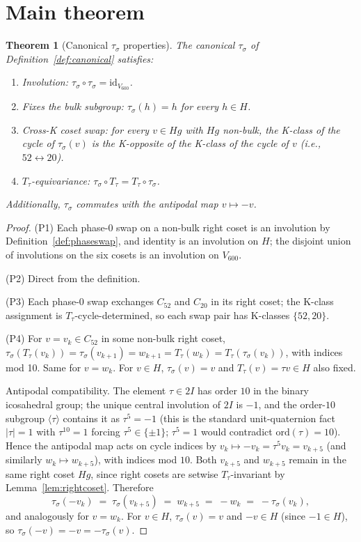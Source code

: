 \documentclass[11pt]{article}
\newtheorem{theorem}{Theorem}[section]
\newcommand{\twoI}{2I}
\newcommand{\Vsixhundred}{V_{600}}
\newcommand{\sigmaG}{\sigma}
\newcommand{\tausigma}{\tau_{\!\sigmaG}}
\newcommand{\Ttau}{T_{\tau}}
\begin{document}
\section{Main theorem}\label{sec:main}

\begin{theorem}[Canonical $\tausigma$ properties]\label{thm:main}
The canonical $\tausigma$ of Definition~\ref{def:canonical} satisfies:
\begin{enumerate}[label=(P\arabic*),leftmargin=3em]
\item \emph{Involution:} $\tausigma \circ \tausigma = \mathrm{id}_{\Vsixhundred}$.
\item \emph{Fixes the bulk subgroup:} $\tausigma(h) = h$ for every $h \in H$.
\item \emph{Cross-K coset swap:} for every $v \in Hg$ with $Hg$
non-bulk, the K-class of the cycle of $\tausigma(v)$ is the
K-opposite of the K-class of the cycle of $v$ (i.e., $52
\leftrightarrow 20$).
\item \emph{$\Ttau$-equivariance:} $\tausigma \circ \Ttau = \Ttau \circ \tausigma$.
\end{enumerate}
Additionally, $\tausigma$ commutes with the antipodal map
$v \mapsto -v$.
\end{theorem}

\begin{proof}
(P1) Each phase-$0$ swap on a non-bulk right coset is an involution by
Definition~\ref{def:phaseswap}, and identity is an involution on $H$;
the disjoint union of involutions on the six cosets is an involution
on $\Vsixhundred$.

(P2) Direct from the definition.

(P3) Each phase-$0$ swap exchanges $C_{52}$ and $C_{20}$ in its right
coset; the K-class assignment is $\Ttau$-cycle-determined, so each
swap pair has K-classes $\{52, 20\}$.

(P4) For $v = v_k \in C_{52}$ in some non-bulk right coset,
$\tausigma(\Ttau(v_k)) = \tausigma(v_{k+1}) = w_{k+1} =
\Ttau(w_k) = \Ttau(\tausigma(v_k))$, with indices mod 10. Same for
$v = w_k$. For $v \in H$, $\tausigma(v) = v$ and $\Ttau(v) =
\tau v \in H$ also fixed.

Antipodal compatibility. The element $\tau \in \twoI$ has order $10$
in the binary icosahedral group; the unique central involution of
$\twoI$ is $-1$, and the order-$10$ subgroup $\langle \tau \rangle$
contains it as $\tau^5 = -1$ (this is the standard unit-quaternion
fact $|\tau| = 1$ with $\tau^{10} = 1$ forcing $\tau^5 \in \{\pm 1\}$;
$\tau^5 = 1$ would contradict $\mathrm{ord}(\tau) = 10$). Hence the
antipodal map acts on cycle indices by
$v_k \mapsto -v_k = \tau^5 v_k = v_{k+5}$
(and similarly $w_k \mapsto w_{k+5}$), with indices mod $10$. Both
$v_{k+5}$ and $w_{k+5}$ remain in the same right coset $Hg$, since
right cosets are setwise $\Ttau$-invariant by
Lemma~\ref{lem:rightcoset}. Therefore
\[
  \tausigma(-v_k) \;=\; \tausigma(v_{k+5}) \;=\; w_{k+5} \;=\; -w_k \;=\; -\tausigma(v_k),
\]
and analogously for $v = w_k$. For $v \in H$, $\tausigma(v) = v$ and
$-v \in H$ (since $-1 \in H$), so $\tausigma(-v) = -v = -\tausigma(v)$.
\end{proof}
\end{document}
